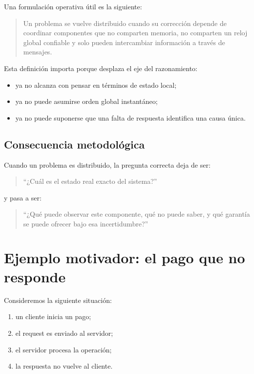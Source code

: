 \documentclass[variant=apuntes,cover=institutional,mode=screen]{ua-engineering-v6-article}
\begin{document}
Una formulación operativa útil es la siguiente:

\begin{quote}
Un problema se vuelve distribuido cuando su corrección depende de coordinar componentes que no comparten memoria, no comparten un reloj global confiable y solo pueden intercambiar información a través de mensajes.
\end{quote}

Esta definición importa porque desplaza el eje del razonamiento:

\begin{itemize}
\item ya no alcanza con pensar en términos de estado local;
\item ya no puede asumirse orden global instantáneo;
\item ya no puede suponerse que una falta de respuesta identifica una causa única.
\end{itemize}

\subsection{Consecuencia metodológica}\label{subsec:consecuencia-metodologica}

Cuando un problema es distribuido, la pregunta correcta deja de ser:

\begin{quote}
“¿Cuál es el estado real exacto del sistema?”
\end{quote}

y pasa a ser:

\begin{quote}
“¿Qué puede observar este componente, qué no puede saber, y qué garantía se puede ofrecer bajo esa incertidumbre?”
\end{quote}

\section{Ejemplo motivador: el pago que no responde}\label{sec:ejemplo-motivador:-el-pago-que-no-responde}

Consideremos la siguiente situación:

\begin{enumerate}
\item un cliente inicia un pago;
\item el request es enviado al servidor;
\item el servidor procesa la operación;
\item la respuesta no vuelve al cliente.
\end{enumerate}
\end{document}
